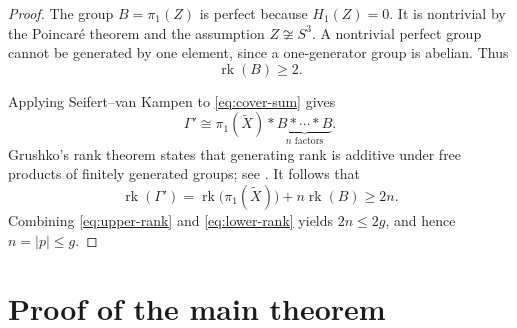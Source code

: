 \documentclass[11pt]{article}
\DeclareMathOperator{\rk}{rk}
\begin{document}
\begin{proof}
The group \(B=\pi_1(Z)\) is perfect because \(H_1(Z)=0\).
It is nontrivial by the Poincar\'e theorem and the assumption
\(Z\not\cong S^3\). A nontrivial perfect group cannot be generated by
one element, since a one-generator group is abelian. Thus
\[
    \rk(B)\geq 2.
\]

Applying Seifert--van Kampen to \eqref{eq:cover-sum} gives
\[
    \Gamma'\cong
    \pi_1(\widetilde X)*
    \underbrace{B*\cdots*B}_{n\text{ factors}}.
\]
Grushko's rank theorem states that generating rank is additive under
free products of finitely generated groups; see \cite{Stallings}.
It follows that
\begin{equation}\label{eq:lower-rank}
    \rk(\Gamma')
      =\rk\bigl(\pi_1(\widetilde X)\bigr)+n\rk(B)
      \geq 2n.
\end{equation}
Combining \eqref{eq:upper-rank} and \eqref{eq:lower-rank} yields
\(2n\leq 2g\), and hence \(n=|p|\leq g\).
\end{proof}

\section{Proof of the main theorem}
\end{document}
